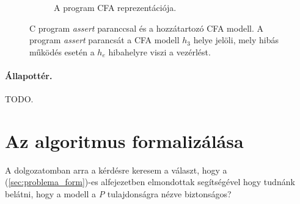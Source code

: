 \begin{example}
\begin{figure}[!htb]
\begin{subfigure}[b]{.56\linewidth}
			\caption{A program CFA reprezentációja.}
			\label{fig:assert2}
		\end{subfigure}
		\caption{C program \emph{assert} paranccsal és a hozzátartozó CFA modell. A program \emph{assert} parancsát a CFA modell $h_3$ helye jelöli, mely hibás működés esetén a $h_e$ hibahelyre viszi a vezérlést.}
		\label{fig:assert}
	\end{figure}
\end{example}

\paragraph{Állapottér.}
TODO.

\section{Az algoritmus formalizálása}
\label{sec:formalizalt_alg}

A dolgozatomban arra a kérdésre keresem a választ, hogy a (\ref{sec:problema_form})-es alfejezetben elmondottak segítségével hogy tudnánk belátni, hogy a modell a \emph{P} tulajdonságra nézve biztonságos?

